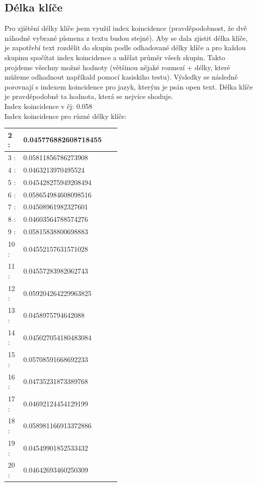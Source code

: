 \documentclass{article}
\begin{document}
    \subsection{Délka klíče}
    Pro zjištění délky klíče jsem využil index koincidence (pravděpodobnost, že dvě náhodně vybrané písmena z textu budou stejné). 
    Aby se dala zjistit  délka klíče, je zapotřebí text rozdělit do skupin podle odhadované délky klíče a pro každou skupinu spočítat
    index koincidence a udělat průměr všech skupin. Takto projdeme všechny možné hodnoty (většinou nějaké rozmezí + délky, které můžeme odhadnout 
    napříkald pomocí kasiskiho testu). Výsledky se následně porovnají s indexem koincidence pro jazyk, kterým je psán open text. Délka klíče je 
    pravděpodobně ta hodnota, která se nejvíce shoduje.
    \\
    Index koincidence v čj: 0.058\\
    Index koincidence pro různé délky klíče:
    \begin{tabular}{|p{0.05\linewidth}|p{0.4\linewidth}|}
        \hline
        2 :& 0.045776882608718455 \\ \hline
        3 :& 0.05811856786273908 \\ \hline
        4 :& 0.0463213970495524 \\ \hline
        5 :& 0.045428275949208494 \\ \hline
        6 :& 0.058654984608098516 \\ \hline
        7 :& 0.04508961982327601 \\ \hline
        8 :& 0.04603564788574276 \\ \hline
        9 :& 0.05815838800698883 \\ \hline
        10 :& 0.04552157631571028 \\ \hline
        11 :& 0.04557283982062743 \\ \hline
        12 :& 0.059204264229963825 \\ \hline
        13 :& 0.0458975794642088 \\ \hline
        14 :& 0.045027054180483084 \\ \hline
        15 :& 0.05708591668692233 \\ \hline
        16 :& 0.04735231873389768 \\ \hline
        17 :& 0.04692124454129199 \\ \hline
        18 :& 0.058981166913372886 \\ \hline
        19 :& 0.04549901852533432 \\ \hline
        20 :& 0.04642693460250309 \\
        \hline
    \end{tabular}
    \\
\end{document}
